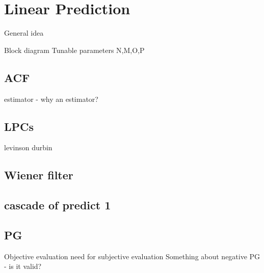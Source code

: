 \section{Linear Prediction}
General idea

Block diagram
Tunable parameters N,M,O,P


\subsection{ACF}
estimator - why an estimator?

\subsection{LPCs}
levinson durbin

\subsection{Wiener filter}

\subsection{cascade of predict 1}

\subsection{PG}
Objective evaluation
need for subjective evaluation
Something about negative PG - is it valid? 